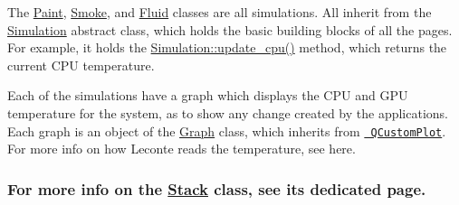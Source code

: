 The \mbox{\hyperlink{classPaint}{Paint}}, \mbox{\hyperlink{classSmoke}{Smoke}}, and \mbox{\hyperlink{classFluid}{Fluid}} classes are all simulations. All inherit from the \mbox{\hyperlink{classSimulation}{Simulation}} abstract class, which holds the basic building blocks of all the pages. For example, it holds the {\ttfamily \mbox{\hyperlink{classSimulation_a36aefdee44fabe9b8070363ca9eb80a7}{Simulation\+::update\+\_\+cpu()}}} method, which returns the current C\+PU temperature.

Each of the simulations have a graph which displays the C\+PU and G\+PU temperature for the system, as to show any change created by the applications. Each graph is an object of the \mbox{\hyperlink{classGraph}{Graph}} class, which inherits from \href{https://www.qcustomplot.com/}{\texttt{ Q\+Custom\+Plot}}. For more info on how Leconte reads the temperature, see here.

\subsubsection*{For more info on the \mbox{\hyperlink{classStack}{Stack}} class, see it\textquotesingle{}s dedicated page.}